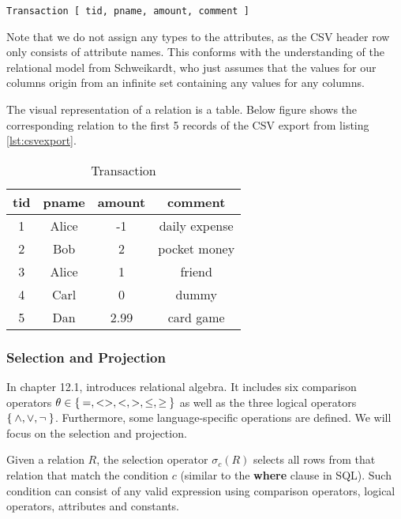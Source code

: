 \begin{center}
\verb+Transaction [ tid, pname, amount, comment ]+
\end{center}

Note that we do not assign any types to the attributes,
as the CSV header row only consists of attribute names.
This conforms with the understanding of the relational model
from Schweikardt, who just assumes that the values for our columns origin from an infinite set
containing any values for any columns.

The visual representation of a relation is a table. Below figure shows the
corresponding relation to the first 5 records of the CSV export from listing \ref{lst:csvexport}.

\begin{table}[htbp]
    \centering
    \begin{tabular}{|c|c|c|c|}
        \hline
        tid     & pname & amount    & comment \\ \hline\hline
        1       & Alice & -1        & daily expense \\ \hline
        2       & Bob   & 2         & pocket money \\ \hline
        3       & Alice & 1         & friend\\ \hline
        4       & Carl  & 0         & dummy\\ \hline
        5       & Dan   & 2.99      & card game\\ \hline
    \end{tabular}
    \caption{Transaction}
    \label{Transaction}
\end{table}

\subsubsection{Selection and Projection}

In chapter 12.1, \cite{Halp08} introduces relational algebra. It includes six
comparison operators $\theta \in \Set{=, <>, <, >, \leq, \geq}$ as well as the
three logical operators $\Set{\land, \lor, \neg}$. Furthermore, some
language-specific operations are defined. We will focus on the selection and projection.

Given a relation $R$, the selection operator $\sigma_c(R)$ selects all rows from
that relation that match the condition $c$ (similar to the \textbf{where} clause in \gls{SQL}).
Such condition can consist of any valid
expression using comparison operators, logical operators, attributes and constants.

